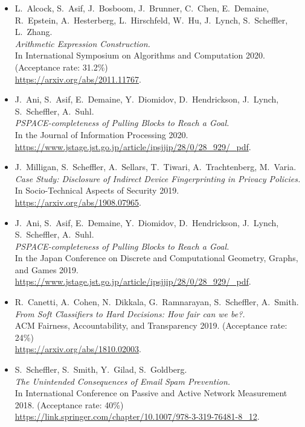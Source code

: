 \documentclass{res}
\begin{document}
\begin{resume}
\begin{itemize}
\item[\AEC] L.~Alcock, S.~Asif, J.~Bosboom, J.~Brunner, C.~Chen, E.~Demaine, R.~Epstein,
A.~Hesterberg, L.~Hirschfeld, W.~Hu, J.~Lynch, S.~Scheffler, L.~Zhang. \\
\emph{Arithmetic Expression Construction.} \\
In International Symposium on Algorithms and Computation 2020. (Acceptance rate: 31.2\%) \\
\url{https://arxiv.org/abs/2011.11767}.

\item[\pullingblocksJIP] J.~Ani, S.~Asif, E.~Demaine, Y.~Diomidov, D.~Hendrickson, J.~Lynch, S.~Scheffler, A.~Suhl. \\
\emph{PSPACE-completeness of Pulling Blocks to Reach a Goal.} \\
In the Journal of Information Processing 2020.\\
\url{https://www.jstage.jst.go.jp/article/ipsjjip/28/0/28_929/_pdf}.

\item[\devicefingerprinting] J.~Milligan, S.~Scheffler, A.~Sellars, T.~Tiwari, A.~Trachtenberg, M.~Varia.  \\
\emph{Case Study: Disclosure of Indirect Device Fingerprinting in Privacy Policies.} \\
In Socio-Technical Aspects of Security 2019. \\
\url{https://arxiv.org/abs/1908.07965}.

\item[\pullingblocks] J.~Ani, S.~Asif, E.~Demaine, Y.~Diomidov, D.~Hendrickson, J.~Lynch, S.~Scheffler, A.~Suhl. \\
\emph{PSPACE-completeness of Pulling Blocks to Reach a Goal.}  \\
In the Japan Conference on Discrete and Computational Geometry, Graphs, and Games 2019. \\
\url{https://www.jstage.jst.go.jp/article/ipsjjip/28/0/28_929/_pdf}.

\item[\fairsibility] R.~Canetti, A.~Cohen, N.~Dikkala, G.~Ramnarayan, S.~Scheffler, A.~Smith. \\
\emph{From Soft Classifiers to Hard Decisions: How fair can we be?.} \\
ACM Fairness, Accountability, and Transparency 2019. (Acceptance rate: 24\%) \\
\url{https://arxiv.org/abs/1810.02003}.

\item[\emailspam] S.~Scheffler, S.~Smith, Y.~Gilad, S.~Goldberg. \\
\emph{The Unintended Consequences of Email Spam Prevention.} \\
In International Conference on Passive and Active Network Measurement 2018. (Acceptance rate: 40\%) \\
\url{https://link.springer.com/chapter/10.1007/978-3-319-76481-8\_12}.
\end{itemize}



\end{resume}
\end{document}
